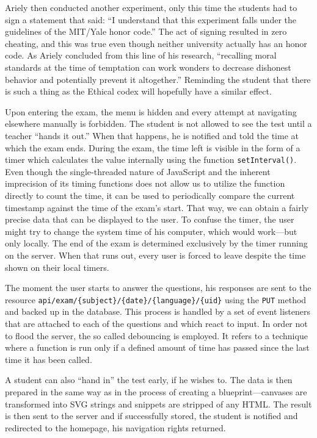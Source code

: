 \documentclass[thesis=M,english,hidelinks]{FITthesis}[2012/10/20]
\newcommand{\code}{\texttt}
\begin{document}
Ariely then conducted another experiment, only this time the students had to sign a statement that said: ``I understand that this experiment falls under the guidelines of the MIT/Yale honor code.'' The act of signing resulted in zero cheating, and this was true even though neither university actually has an honor code. As Ariely concluded from this line of his research, ``recalling moral standards at the time of temptation can work wonders to decrease dishonest behavior and potentially prevent it altogether.'' Reminding the student that there is such a thing as the Ethical codex will hopefully have a similar effect.

Upon entering the exam, the menu is hidden and every attempt at navigating elsewhere manually is forbidden. The student is not allowed to see the test until a teacher ``hands it out.'' When that happens, he is notified and told the time at which the exam ends. During the exam, the time left is visible in the form of a timer which calculates the value internally using the function \code{setInterval()}. Even though the single-threaded nature of JavaScript and the inherent imprecision of its timing functions does not allow us to utilize the function directly to count the time, it can be used to periodically compare the current timestamp against the time of the exam's start. That way, we can obtain a fairly precise data that can be displayed to the user. To confuse the timer, the user might try to change the system time of his computer, which would work---but only locally. The end of the exam is determined exclusively by the timer running on the server. When that runs out, every user is forced to leave despite the time shown on their local timers.

The moment the user starts to answer the questions, his responses are sent to the resource \code{api/exam/\{subject\}/\{date\}/\{language\}/\{uid\}} using the \code{PUT} method and backed up in the database. This process is handled by a set of event listeners that are attached to each of the questions and which react to input. In order not to flood the server, the so called debouncing is employed. It refers to a technique where a function is run only if a defined amount of time has passed since the last time it has been called.

A student can also ``hand in'' the test early, if he wishes to. The data is then prepared in the same way as in the process of creating a blueprint---canvases are transformed into SVG strings and snippets are stripped of any HTML. The result is then sent to the server and if successfully stored, the student is notified and redirected to the homepage, his navigation rights returned.
\end{document}

